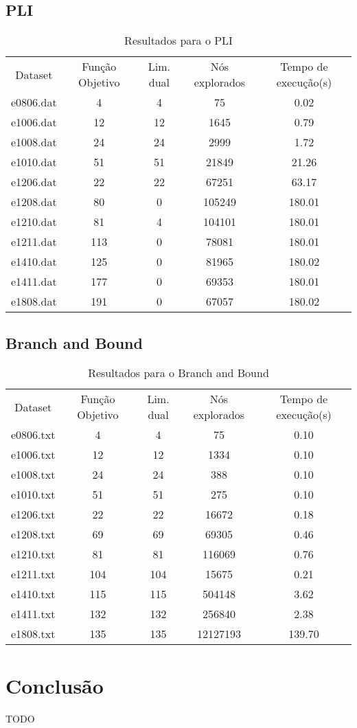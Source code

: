 \documentclass[a4paper,11pt]{article}
\begin{document}
\subsection{PLI}
\begin{table}[h]
  \centering
  \begin{tabular}{c c c c c}
    Dataset & Função Objetivo & Lim. dual & Nós explorados  & Tempo de execução(s) \\
    e0806.dat & 4   & 4  & 75     & 0.02   \\
    e1006.dat & 12  & 12 & 1645   & 0.79   \\
    e1008.dat & 24  & 24 & 2999   & 1.72   \\
    e1010.dat & 51  & 51 & 21849  & 21.26  \\
    e1206.dat & 22  & 22 & 67251  & 63.17  \\
    e1208.dat & 80  & 0  & 105249 & 180.01 \\
    e1210.dat & 81  & 4  & 104101 & 180.01 \\
    e1211.dat & 113 & 0  & 78081  & 180.01 \\
    e1410.dat & 125 & 0  & 81965  & 180.02 \\
    e1411.dat & 177 & 0  & 69353  & 180.01 \\
    e1808.dat & 191 & 0  & 67057  & 180.02 \\
  \end{tabular}
  \caption{Resultados para o PLI}
  \label{pli}
\end{table}

\subsection{Branch and Bound}
\begin{table}[h]
  \centering
  \begin{tabular}{c c c c c}
  Dataset & Função Objetivo & Lim. dual & Nós explorados  & Tempo de execução(s) \\
  e0806.txt & 4   & 4   & 75       & 0.10 \\
  e1006.txt & 12  & 12  & 1334     & 0.10 \\
  e1008.txt & 24  & 24  & 388      & 0.10 \\
  e1010.txt & 51  & 51  & 275      & 0.10 \\
  e1206.txt & 22  & 22  & 16672    & 0.18 \\
  e1208.txt & 69  & 69  & 69305    & 0.46 \\
  e1210.txt & 81  & 81  & 116069   & 0.76 \\
  e1211.txt & 104 & 104 & 15675    & 0.21 \\
  e1410.txt & 115 & 115 & 504148   & 3.62 \\
  e1411.txt & 132 & 132 & 256840   & 2.38 \\
  e1808.txt & 135 & 135 & 12127193 & 139.70 \\
  \end{tabular}
  \caption{Resultados para o Branch and Bound}
  \label{bnb}
\end{table}

\section{Conclusão}
TODO
\end{document}
